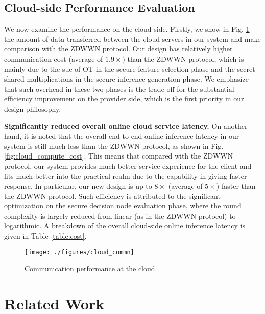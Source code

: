\documentclass[10pt,journal,compsoc]{IEEEtran}
\begin{document}
\subsection{Cloud-side Performance Evaluation}
%
We now examine the performance on the cloud side.
%
Firstly, we show in Fig. \ref{fig:cloud_commn_cost} the amount of data transferred between the cloud servers in our system and make comparison with the ZDWWN protocol.
%
Our design has relatively higher communication cost (average of $1.9\times$) than the ZDWWN protocol, which is mainly due to the sue of OT in the secure feature selection phase and the secret-shared multiplications in the secure inference generation phase.
%
We emphasize that such overhead in these two phases is the trade-off for the substantial efficiency improvement on the provider side, which is the first priority in our design philosophy.


\noindent\textbf{Significantly reduced overall online cloud service latency.} On another hand, it is noted that the overall end-to-end online inference latency in our system is still much less than the ZDWWN protocol, as shown in Fig. \ref{fig:cloud_compute_cost}.
%
This means that compared with the ZDWWN protocol, our system provides much better service experience for the client and fits much better into the practical realm due to the capability in giving faster response.
%
In particular, our new design is up to $8\times$ (average of $5 \times$) faster than the ZDWWN protocol.
%
Such efficiency is attributed to the significant optimization on the secure decision node evaluation phase, where the round complexity is largely reduced from linear (as in the ZDWWN protocol) to logarithmic.
%
A breakdown of the overall cloud-side online inference latency is given in Table \ref{table:cost}.






\begin{figure}[t!]
\centerline{\texttt{[image: ./figures/cloud\_commn]}}
\caption{Communication performance at the cloud.}
\label{fig:cloud_commn_cost}
\end{figure}












\section{Related Work}
\label{sec:related_work}
\end{document}
